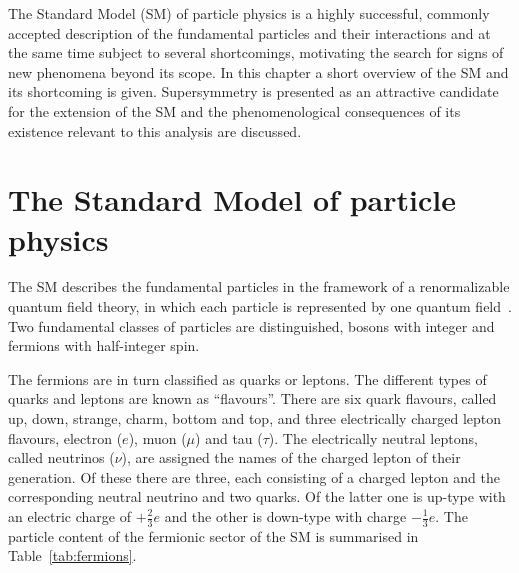 The Standard Model (SM) of particle physics is a highly successful, commonly accepted description of the fundamental particles and their interactions and at the same time subject to several shortcomings, motivating the search for signs of new phenomena beyond its scope. In this chapter a short overview of the SM and its shortcoming is given. Supersymmetry is presented as an attractive candidate for the extension of the SM and the phenomenological consequences of its existence relevant to this analysis are discussed. 
\label{sec:theo}
\section{The Standard Model of particle physics}
The SM describes the fundamental particles in the framework of a renormalizable quantum field theory, in which each particle is represented by one quantum field~\cite{Glashow1961579,Salam1964168,PhysRevLett.19.1264,PhysRevD.5.1412}. Two fundamental classes of particles are distinguished, bosons with integer and fermions with half-integer spin. 

The fermions are in turn classified as quarks or leptons. The different types of quarks and leptons are known as ``flavours''. There are six quark flavours, called up, down, strange, charm, bottom and top, and three electrically charged lepton flavours, electron ($e$), muon ($\mu$) and tau ($\tau$). The electrically neutral leptons, called neutrinos ($\nu$), are assigned the names of the charged lepton of their generation. Of these there are three, each consisting of a charged lepton and the corresponding neutral neutrino and two quarks. Of the latter one is up-type with an electric charge of $+\frac{2}{3}e$ and the other is down-type with charge $-\frac{1}{3}e$. The particle content of the fermionic sector of the SM is summarised in Table~\ref{tab:fermions}.

